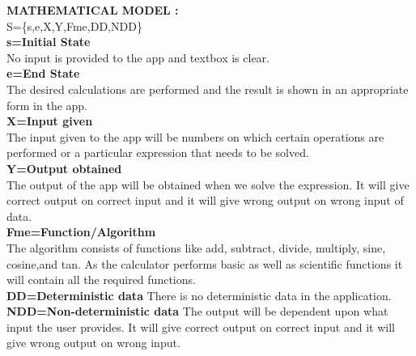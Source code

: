 \documentclass[a4paper,12pt]{article}
\begin{document}
\bigskip
\bigskip
\bigskip
\bigskip
\bigskip
\bigskip
\bigskip
\bigskip
\bigskip
\bigskip
\bigskip
\bigskip
\bigskip
\bigskip
\bigskip
\bigskip

\newpage

\noindent \textbf{MATHEMATICAL MODEL :}\\[0.5cm]
S=\{s,e,X,Y,Fme,DD,NDD\}\\[0.5cm]

\textbf{s=Initial State}\\
No input is provided to the app and textbox is clear.
\\[0.5cm]
\textbf{e=End State}\\

The desired calculations are performed and the result is shown in an appropriate form in the app.
\\

\textbf{X=Input given}\\
The input given to the app will be numbers on which certain operations are performed or a particular expression that needs to be solved.
\\

\textbf{Y=Output obtained}\\
 The output of the app will be obtained when we solve the expression. It will give correct output on correct input and it will give wrong output on wrong input of data.
 \\

\textbf{Fme=Function/Algorithm}\\
The algorithm consists of functions like add, subtract, divide, multiply, sine, cosine,and tan. As the calculator performs basic as well as scientific functions it will contain all the required functions.
\\

\textbf{DD=Deterministic data}
There is no deterministic data in the application.
\\

\textbf{NDD=Non-deterministic data}
The output will be dependent upon what input the user provides. It will give correct output on correct input and it will give wrong output on wrong input.
\\
\end{document}
